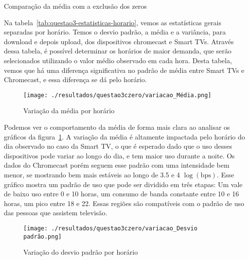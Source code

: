 \documentclass{article}
\begin{document}
\begin{table}[h]
	\centering
	
	\caption{Comparação da média com a exclusão dos zeros}
	\label{tab:questao3-comparacao-zeros}
\end{table}


Na tabela~\ref{tab:questao3-estatisticas-horario}, vemos as estatísticas gerais separadas por horário. Temos o desvio padrão, a média e a variância, para download e depois upload, dos dispositivos chromecast e Smart TVs. Através dessa tabela, é possível determinar os horários de maior demanda, que serão selecionados utilizando o valor médio observado em cada hora. Desta tabela, vemos que há uma diferença significativa no padrão de média entre Smart TVs e Chromecast, e essa diferença se dá pelo horário.

\begin{figure}[h]
	\centering
	\caption{Variação da média por horário}
	\texttt{[image: ./resultados/questao3czero/variacao\_Média.png]}
	\label{fig:questao3-variacao-media}
\end{figure}

Podemos ver o comportamento da média de forma mais clara ao analisar os gráficos da figura~\ref{fig:questao3-variacao-media}. A variação da média é altamente impactada pelo horário do dia observado no caso da Smart TV, o que é esperado dado que o uso desses dispositivos pode variar ao longo do dia, e tem maior uso durante a noite. Os dados do Chromecast porém seguem esse padrão com uma intensidade bem menor, se mostrando bem mais estáveis ao longo de 3.5 e 4 $\log(\text{bps})$. Esse gráfico mostra um padrão de uso que pode ser dividido em três etapas: Um vale de baixo uso entre 0 e 10 horas, um consumo de banda constante entre 10 e 16 horas, um pico entre 18 e 22. Essas regiões são compatíveis com o padrão de uso das pessoas que assistem televisão.

\begin{figure}[h]
	\centering
	\caption{Variação do desvio padrão por horário}
	\texttt{[image: ./resultados/questao3czero/variacao\_Desvio padrão.png]}
	\label{fig:questao3-variacao-std}
\end{figure}
\end{document}
